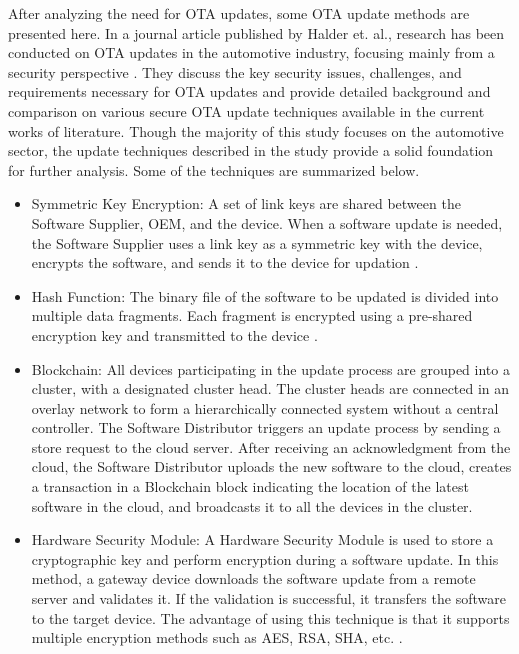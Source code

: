 After analyzing the need for \acrshort{OTA} updates, some \acrshort{OTA} update methods are presented here. In a journal article published by Halder et. al., research has been conducted on \acrshort{OTA} updates in the automotive industry, focusing mainly from a security perspective \cite{halder2020article}. They discuss the key security issues, challenges, and requirements necessary for \acrshort{OTA} updates and provide detailed background and comparison on various secure \acrshort{OTA} update techniques available in the current works of literature. Though the majority of this study focuses on the automotive sector, the update techniques described in the study provide a solid foundation for further analysis. Some of the techniques are summarized below.
\begin{itemize}
\renewcommand{\labelitemi}{$\bullet$}
    \item Symmetric Key Encryption: A set of link keys are shared between the Software Supplier, OEM, and the device. When a software update is needed, the Software Supplier uses a link key as a symmetric key with the device, encrypts the software, and sends it to the device for updation \cite{mahmud2005}.
    \item Hash Function: The binary file of the software to be updated is divided into multiple data fragments. Each fragment is encrypted using a pre-shared encryption key and transmitted to the device \cite{nilsson2008}.
    \item Blockchain: All devices participating in the update process are grouped into a cluster, with a designated cluster head. The cluster heads are connected in an overlay network to form a hierarchically connected system without a central controller. The Software Distributor triggers an update process by sending a store request to the cloud server. After receiving an acknowledgment from the cloud, the Software Distributor uploads the new software to the cloud, creates a transaction in a Blockchain block indicating the location of the latest software in the cloud, and broadcasts it to all the devices in the cluster\cite{steger2018-xo}.
    \item Hardware Security Module: A Hardware Security Module is used to store a cryptographic key and perform encryption during a software update. In this method, a gateway device downloads the software update from a remote server and validates it. If the validation is successful, it transfers the software to the target device. The advantage of using this technique is that it supports multiple encryption methods such as AES, RSA, SHA, etc. \cite{petri2016}. 
\end{itemize}

